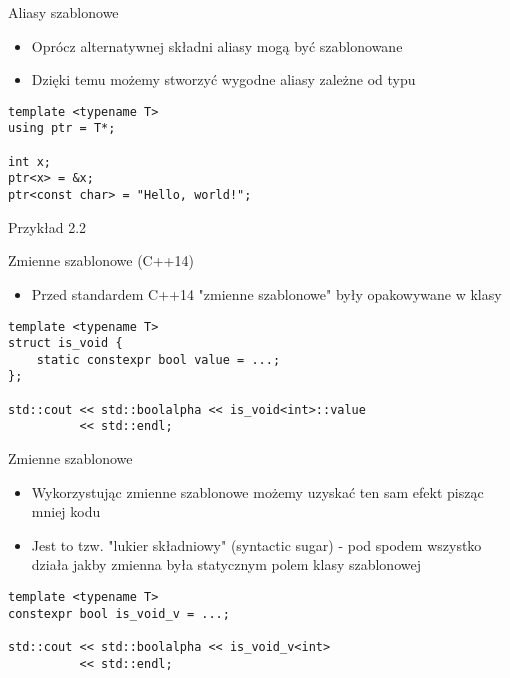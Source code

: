 \documentclass[11pt]{beamer}
\begin{document}
\begin{frame}[fragile]{Aliasy szablonowe}
    \begin{itemize}
        \item Oprócz alternatywnej składni aliasy mogą być szablonowane
        \item Dzięki temu możemy stworzyć wygodne aliasy zależne od typu
    \end{itemize}
    \begin{lstlisting}[frame=single]
template <typename T>
using ptr = T*;

int x;
ptr<x> = &x;
ptr<const char> = "Hello, world!";
    \end{lstlisting}
    \alert{Przykład 2.2}
\end{frame}

\begin{frame}[fragile]{Zmienne szablonowe (C++14)}
    \begin{itemize}
        \item Przed standardem C++14 "zmienne szablonowe" były opakowywane w klasy
    \end{itemize}
    \begin{lstlisting}[frame=single]
template <typename T>
struct is_void {
    static constexpr bool value = ...;
};

std::cout << std::boolalpha << is_void<int>::value
          << std::endl;
    \end{lstlisting}
\end{frame}

\begin{frame}[fragile]{Zmienne szablonowe}
    \begin{itemize}
        \item Wykorzystując zmienne szablonowe możemy uzyskać ten sam efekt pisząc mniej kodu
        \item Jest to tzw. "lukier składniowy" (syntactic sugar) - pod spodem wszystko działa jakby zmienna była statycznym polem klasy szablonowej
    \end{itemize}
    \begin{lstlisting}[frame=single]
template <typename T>
constexpr bool is_void_v = ...;

std::cout << std::boolalpha << is_void_v<int>
          << std::endl;
    \end{lstlisting}
\end{frame}
\end{document}
